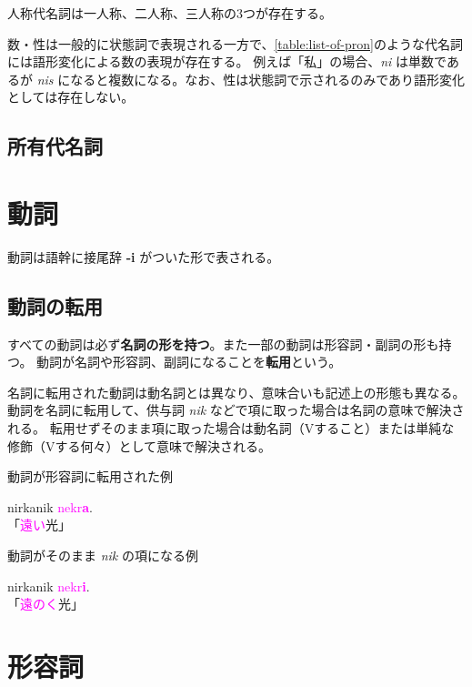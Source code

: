 人称代名詞は一人称、二人称、三人称の3つが存在する。

数・性は一般的に状態詞で表現される一方で、\cref{table:list-of-pron}のような代名詞には語形変化による数の表現が存在する。
例えば「私」の場合、\emph{ni} は単数であるが \emph{nis} になると複数になる。なお、性は状態詞で示されるのみであり語形変化としては存在しない。

\subsection{所有代名詞}

\section{動詞}

動詞は語幹に接尾辞 \textbf{-i} がついた形で表される。

\subsection{動詞の転用}

すべての動詞は必ず\textbf{名詞の形を持つ}。また一部の動詞は形容詞・副詞の形も持つ。
動詞が名詞や形容詞、副詞になることを\textbf{転用}という。

名詞に転用された動詞は動名詞とは異なり、意味合いも記述上の形態も異なる。
動詞を名詞に転用して、供与詞 \emph{nik} などで項に取った場合は名詞の意味で解決される。
転用せずそのまま項に取った場合は動名詞（Vすること）または単純な修飾（Vする何々）として意味で解決される。

\begin{itembox}[l]{動詞が形容詞に転用された例}
    \begin{pindent}
        \noindent
        nirkanik \textcolor{magenta}{nekr\textbf{a}}. \\
        「\textcolor{magenta}{遠い}光」
    \end{pindent}
\end{itembox}

\begin{itembox}[l]{動詞がそのまま \emph{nik} の項になる例}
    \begin{pindent}
        nirkanik \textcolor{magenta}{nekr\textbf{i}}. \\
        「\textcolor{magenta}{遠のく}光」
        \noindent
    \end{pindent}
\end{itembox}

\section{形容詞}

